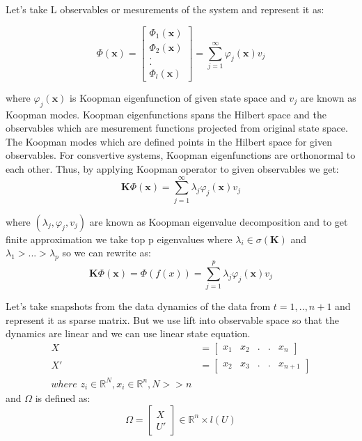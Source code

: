 \documentclass[11pt, reqno, letterpaper, twoside]{amsart}
\theoremstyle{plain}
\theoremstyle{definition}
\begin{document}
Let's take L observables or mesurements of the system and represent it as:

\begin{equation}
    \Phi(\textbf{x}) = \begin{bmatrix}
        \Phi_1(\textbf{x}) \\
        \Phi_2(\textbf{x}) \\
        . \\
        . \\
        \Phi_l(\textbf{x})
    \end{bmatrix} = \sum_{j=1}^{\infty} \varphi_j(\textbf{x})v_{j}
\end{equation}

where $\varphi_j(\textbf{x})$ is Koopman eigenfunction of given state space and $v_{j}$ are known as Koopman modes.  
Koopman eigenfunctions spans the Hilbert space and the observables which are mesurement functions projected from original state space. The Koopman modes which
are defined points in the Hilbert space for given observables. For consvertive systems, Koopman eigenfunctions are orthonormal to each other.
Thus, by applying Koopman operator to given observables we get:
\begin{equation}
    \textbf{K}\Phi(\textbf{x}) = \sum_{j=1}^{\infty} \lambda_j \varphi_j(\textbf{x})v_{j}
\end{equation} 

where ${(\lambda_j,\varphi_j, v_{j})}$ are known as Koopman eigenvalue decomposition and to get finite approximation we take top p eigenvalues 
where $ \lambda_i \in \sigma(\textbf{K})$ and $ \lambda_1 > ... > \lambda_p $ so we can rewrite as:
\begin{equation}
    \textbf{K}\Phi(\textbf{x}) = \Phi(f(x)) = \sum_{j=1}^{p} \lambda_j \varphi_j(\textbf{x})v_{j}
\end{equation}

Let's take snapshots from the data dynamics of the data from $t = 1, .., n+1$ and represent it as
sparse matrix. But we use lift into observable space so that the dynamics are linear and we can use linear state equation.
\begin{equation}
    \begin{split}
        X &= \begin{bmatrix}
            x_1 & x_2 & . & . & x_n
        \end{bmatrix} \\
        X' &= \begin{bmatrix}
            x_2 & x_3 & . & . & x_{n+1}
        \end{bmatrix} \\
        where \hspace{4pt} z_i \in \mathbb{R}^N, x_i \in \mathbb{R}^n, N >> n 
    \end{split}
\end{equation}
and $\Omega$ is defined as:
\begin{equation}
    \Omega = \begin{bmatrix}
        X \\
        U'
    \end{bmatrix} \in \mathbb{R}^n \times l(U)
\end{equation}
\end{document}
